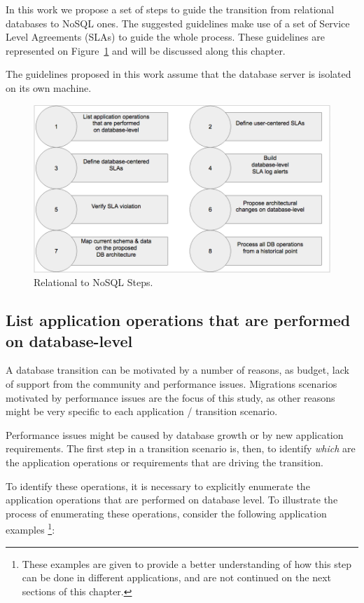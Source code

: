 In this work we propose a set of steps to guide the transition from relational databases to NoSQL ones. The suggested guidelines make use of a set of Service Level Agreements (SLAs) to guide the whole process. These guidelines are represented on Figure~\ref{fig:guidelinesNoSQL} and will be discussed along this chapter.

The guidelines proposed in this work assume that the database server is isolated on its own machine.

\begin{figure}[ht!]
\centering
\includegraphics[width=150mm]{Imagens/guidelines.png}
\caption{Relational to NoSQL Steps.\label{fig:guidelinesNoSQL}}
\end{figure}

\subsection{List application operations that are performed on database-level}

A database transition can be motivated by a number of reasons, as budget, lack of support from the community and performance issues. Migrations scenarios motivated by performance issues are the focus of this study, as other reasons might be very specific to each application / transition scenario. 

Performance issues might be caused by database growth or by new application requirements. The first step in a transition scenario is, then, to identify \textit{which} are the application operations or requirements that are driving the transition. 

To identify these operations, it is necessary to explicitly enumerate the application operations that are performed on database level. To illustrate the process of enumerating these operations, consider the following application examples \footnote{These examples are given to provide a better understanding of how this step can be done in different applications, and are not continued on the next sections of this chapter.}: 

